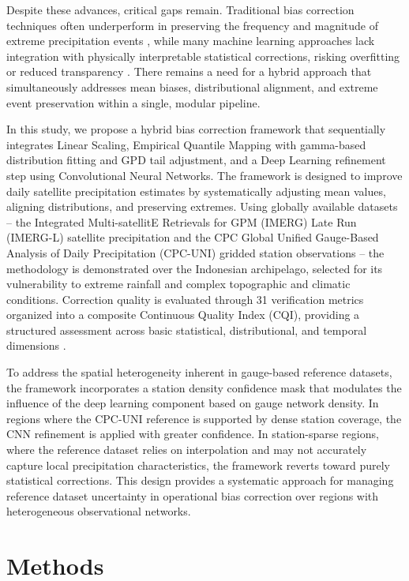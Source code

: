 \documentclass[11pt,a4paper]{article}
\begin{document}
Despite these advances, critical gaps remain. Traditional bias correction techniques often underperform in preserving the frequency and magnitude of extreme precipitation events \cite{ref8,ref11}, while many machine learning approaches lack integration with physically interpretable statistical corrections, risking overfitting or reduced transparency \cite{ref12}. There remains a need for a hybrid approach that simultaneously addresses mean biases, distributional alignment, and extreme event preservation within a single, modular pipeline.

In this study, we propose a hybrid bias correction framework that
sequentially integrates Linear Scaling, Empirical Quantile Mapping with
gamma-based distribution fitting and GPD tail adjustment, and a Deep
Learning refinement step using Convolutional Neural Networks. The
framework is designed to improve daily satellite precipitation estimates
by systematically adjusting mean values, aligning distributions, and
preserving extremes. Using globally available datasets -- the Integrated
Multi-satellitE Retrievals for GPM (IMERG) Late Run (IMERG-L) satellite
precipitation \cite{ref2} and the CPC Global Unified Gauge-Based Analysis of
Daily Precipitation (CPC-UNI) gridded station observations \cite{ref13} --
the methodology is demonstrated over the Indonesian archipelago,
selected for its vulnerability to extreme rainfall and complex
topographic and climatic conditions. Correction quality is evaluated
through 31 verification metrics organized into a composite Continuous
Quality Index (CQI), providing a structured assessment across basic
statistical, distributional, and temporal dimensions \cite{ref14,ref15}.

To address the spatial heterogeneity inherent in gauge-based reference
datasets, the framework incorporates a station density confidence mask
that modulates the influence of the deep learning component based on
gauge network density. In regions where the CPC-UNI reference is
supported by dense station coverage, the CNN refinement is applied with
greater confidence. In station-sparse regions, where the reference
dataset relies on interpolation and may not accurately capture local
precipitation characteristics, the framework reverts toward purely
statistical corrections. This design provides a systematic approach for
managing reference dataset uncertainty in operational bias correction
over regions with heterogeneous observational networks.

\section{Methods}\label{methods}
\end{document}
